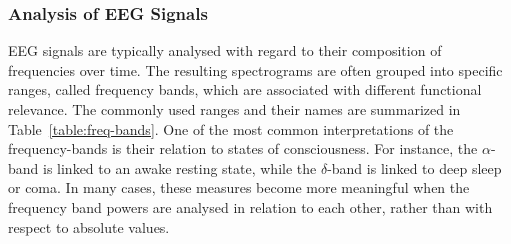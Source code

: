 \subsubsection{Analysis of EEG Signals}
EEG signals are typically analysed with regard to their composition of frequencies over time.
The resulting spectrograms are often grouped into specific ranges, called frequency bands,
which are associated with different functional relevance.
The commonly used ranges and their names \citationneeded are summarized in Table~\ref{table:freq-bands}.
One of the most common interpretations of the frequency-bands is their relation to states of consciousness.
For instance, the $\alpha$-band is linked to an awake resting state,
while the $\delta$-band is linked to deep sleep or coma. \citationneeded
In many cases, these measures become more meaningful when the frequency band powers are analysed in relation to each
other,
rather than with respect to absolute values. \citationneeded


